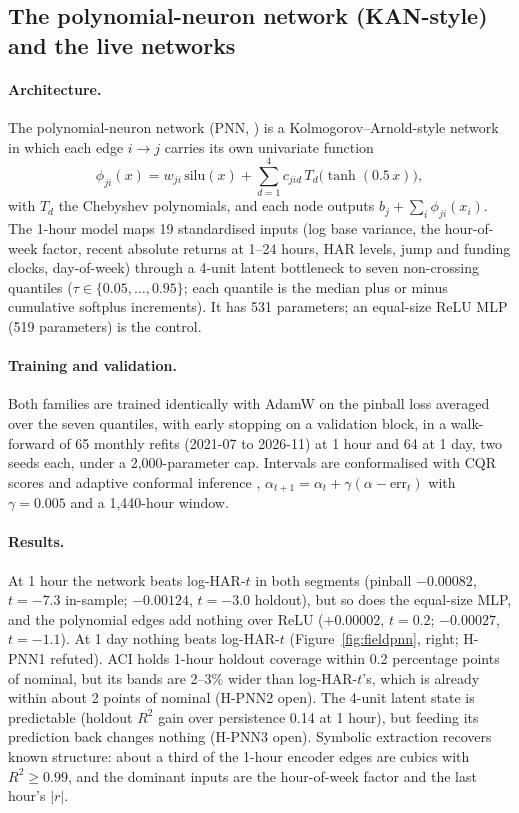 \documentclass[10pt,a4paper]{article}
\newcommand{\hyp}[1]{\textsf{#1}}
\begin{document}
\subsection{The polynomial-neuron network (KAN-style) and the live networks}

\paragraph{Architecture.} The polynomial-neuron network (PNN, \protect{}) is a Kolmogorov--Arnold-style network \citep{liu2024kan} in which each edge $i\to j$ carries its own univariate function
\begin{equation}
\phi_{ji}(x) = w_{ji}\,\mathrm{silu}(x) + \sum_{d=1}^{4} c_{jid}\,T_d\bigl(\tanh(0.5\,x)\bigr),
\end{equation}
with $T_d$ the Chebyshev polynomials, and each node outputs $b_j + \sum_i \phi_{ji}(x_i)$. The 1-hour model maps 19 standardised inputs (log base variance, the hour-of-week factor, recent absolute returns at 1--24 hours, HAR levels, jump and funding clocks, day-of-week) through a 4-unit latent bottleneck to seven non-crossing quantiles ($\tau \in \{0.05,\dots,0.95\}$; each quantile is the median plus or minus cumulative softplus increments). It has 531 parameters; an equal-size ReLU MLP (519 parameters) is the control.

\paragraph{Training and validation.} Both families are trained identically with AdamW on the pinball loss averaged over the seven quantiles, with early stopping on a validation block, in a walk-forward of 65 monthly refits (2021-07 to 2026-11) at 1 hour and 64 at 1 day, two seeds each, under a 2,000-parameter cap. Intervals are conformalised with CQR scores \citep{romano2019} and adaptive conformal inference \citep{gibbs2021}, $\alpha_{t+1} = \alpha_t + \gamma(\alpha - \text{err}_t)$ with $\gamma = 0.005$ and a 1,440-hour window.

\paragraph{Results.} At 1 hour the network beats log-HAR-$t$ in both segments (pinball $-0.00082$, $t=-7.3$ in-sample; $-0.00124$, $t=-3.0$ holdout), but so does the equal-size MLP, and the polynomial edges add nothing over ReLU ($+0.00002$, $t=0.2$; $-0.00027$, $t=-1.1$). At 1 day nothing beats log-HAR-$t$ (Figure~\ref{fig:fieldpnn}, right; \hyp{H-PNN1} refuted). ACI holds 1-hour holdout coverage within 0.2 percentage points of nominal, but its bands are 2--3\% wider than log-HAR-$t$'s, which is already within about 2 points of nominal (\hyp{H-PNN2} open). The 4-unit latent state is predictable (holdout $R^2$ gain over persistence 0.14 at 1 hour), but feeding its prediction back changes nothing (\hyp{H-PNN3} open). Symbolic extraction recovers known structure: about a third of the 1-hour encoder edges are cubics with $R^2\ge 0.99$, and the dominant inputs are the hour-of-week factor and the last hour's $|r|$.
\end{document}
